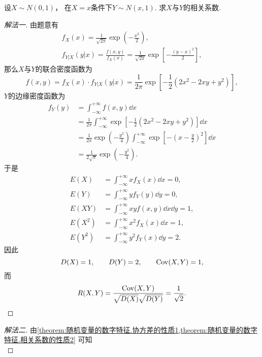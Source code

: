 \begin{example}
设\(X \sim N(0,1)\)，
在\(X=x\)条件下\(Y \sim N(x,1)\).
求\(X\)与\(Y\)的相关系数.
\begin{solution}\let\qed\relax
\begin{proof}[解法一]
由题意有\begin{gather*}
	f_X(x) = \frac1{\sqrt{2\pi}} \exp(-\frac{x^2}2), \\
	f_{Y \vert X}(y \vert x)
	= \frac{f(x,y)}{f_X(x)}
	= \frac1{\sqrt{2\pi}} \exp[-\frac{(y-x)^2}2],
\end{gather*}
那么\(X\)与\(Y\)的联合密度函数为\begin{equation*}
	f(x,y) = f_X(x) \cdot f_{Y \vert X}(y \vert x)
	= \frac1{2\pi} \exp[-\frac12(2x^2-2xy+y^2)],
\end{equation*}
\(Y\)的边缘密度函数为\begin{align*}
	f_Y(y) &= \int_{-\infty}^{+\infty} f(x,y) \dd{x} \\
	&= \frac1{2\pi} \int_{-\infty}^{+\infty} \exp[-\frac12(2x^2-2xy+y^2)] \dd{x} \\
	&= \frac1{2\pi} \exp(-\frac{y^2}4)
	\int_{-\infty}^{+\infty} \exp[-\left( x-\frac{y}2 \right)^2] \dd{x} \\
	&= \frac1{2\sqrt\pi} \exp(-\frac{y^2}4).
\end{align*}
于是\begin{align*}
	E(X) &= \int_{-\infty}^{+\infty} x f_X(x) \dd{x} = 0, \\
	E(Y) &= \int_{-\infty}^{+\infty} y f_Y(y) \dd{y} = 0, \\
	E(XY) &= \int_{-\infty}^{+\infty} x y f(x,y) \dd{x}\dd{y} = 1, \\
	E(X^2) &= \int_{-\infty}^{+\infty} x^2 f_X(x) \dd{x} = 1, \\
	E(Y^2) &= \int_{-\infty}^{+\infty} y^2 f_Y(x) \dd{y} = 2.
\end{align*}
因此\begin{equation*}
	D(X) = 1, \qquad
	D(Y) = 2, \qquad
	\operatorname{Cov}(X,Y) = 1,
\end{equation*}
而\begin{equation*}
	R(X,Y) = \frac{\operatorname{Cov}(X,Y)}{\sqrt{D(X)} \sqrt{D(Y)}}
	= \frac1{\sqrt2}.
\end{equation*}
\end{proof}
\begin{proof}[解法二]
由\cref{theorem:随机变量的数字特征.协方差的性质1,theorem:随机变量的数字特征.相关系数的性质2}
可知\begin{equation*}

\end{equation*}
\end{proof}
\end{solution}
\end{example}
